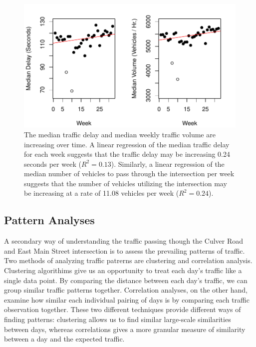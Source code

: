 \documentclass{report}
\begin{document}
\begin{figure}[H]
\centering

\includegraphics{upstat_report-VolumePlot}
\caption{The median traffic delay and median weekly
traffic volume are increasing over time. A linear regression of the median
traffic delay for each week suggests that the traffic delay may be increasing
0.24 seconds per week
($R^2 = 0.13$). Similarly, a linear
regression of the median number of vehicles to pass through the intersection per
week suggests that the number of vehicles utilizing the intersection may be
increasing at a rate of 11.08 vehicles
per week ($R^2 = 0.24$).}
\label{trends}
\end{figure}

\subsection*{Pattern Analyses}

A secondary way of understanding the traffic passing though the Culver Road and
East Main Street intersection is to assess the prevailing patterns of traffic.
Two methods of analyzing traffic patrerns are clustering and correlation analysis.
Clustering algorithims give us an opportunity to treat each day's traffic like
a single data point. By comparing the distance between each day's traffic, we can
group similar traffic patterns together. Correlation analyses, on the other hand,
examine how similar each individual pairing of days is by comparing each traffic
observation together. These two different techniques provide different ways of
finding patterns: clustering allows us to find similar large-scale similarities
between days, whereas correlations gives a more granular measure of similarity
between a day and the expected traffic.
\end{document}
